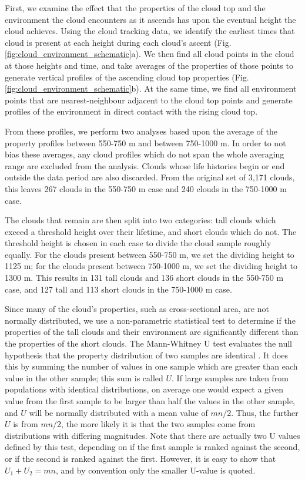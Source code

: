 \documentclass[acp]{copernicus}
\begin{document}
First, we examine the effect that the properties of the cloud top and the 
environment the cloud encounters as it ascends has upon the eventual height the 
cloud achieves.  Using the cloud tracking data, we identify the earliest times 
that cloud is present at each height during each cloud's ascent 
(Fig. \ref{fig:cloud_environment_schematic}a).  We then find all cloud points 
in the cloud at those heights and time, and take averages of the properties of 
those points to generate vertical profiles of the ascending cloud top 
properties (Fig. \ref{fig:cloud_environment_schematic}b).  At the same time, 
we find all environment points that are nearest-neighbour adjacent to the cloud 
top points and generate profiles of the environment in direct contact with the 
rising cloud top.

From these profiles, we perform two analyses based upon the average of the 
property profiles between 550-750 m and between 750-1000 m.  In order to not 
bias these averages, any cloud profiles which do not span the whole averaging 
range are excluded from the analysis.  Clouds whose life histories begin or end 
outside the data period are also discarded.  From the original set of 3,171 
clouds, this leaves 267 clouds in the 550-750 m case and 240 clouds in the 
750-1000 m case.

The clouds that remain are then split into two categories: tall clouds which 
exceed a threshold height over their lifetime, and short clouds which do not.  
The threshold height is chosen in each case to divide the cloud sample roughly 
equally.  For the clouds present between 550-750 m, we set the dividing 
height to 1125 m; for the clouds present between 750-1000 m, we set the 
dividing height to 1300 m.  This results in 131 tall clouds and 136 short 
clouds in the 550-750 m case, and 127 tall and 113 short clouds in the 
750-1000 m case.

Since many of the cloud's properties, such as cross-sectional area, are not 
normally distributed, we use a non-parametric statistical test to determine if 
the properties of the tall clouds and their environment are significantly 
different than the properties of the short clouds.  The Mann-Whitney U test 
evaluates the null hypothesis that the property distribution of two samples are 
identical \citep{Mann1947}.  It does this by summing the number of values 
in one sample which are greater than each value in the other sample; this sum 
is called $U$.  If large samples are taken from populations with identical 
distributions, on average one would expect a given value from the first sample 
to be larger than half the values in the other sample, and $U$ will be normally 
distributed with a mean value of $mn/2$.  Thus, the further $U$ is from $mn/2$, 
the more likely it is that the two samples come from distributions with 
differing magnitudes.  Note that there are actually two U values defined by 
this test, depending on if the first sample is ranked against the second, or 
if the second is ranked against the first.  However, it is easy to show that 
$U_1 + U_2 = mn$, and by convention only the smaller U-value is quoted.
\end{document}
